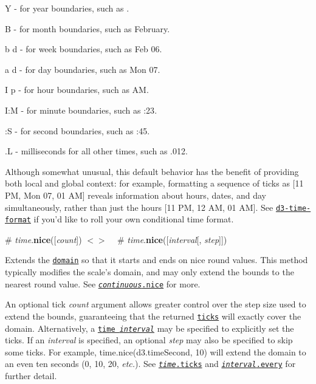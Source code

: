 \begin{DoxyItemize}
\item {\ttfamily Y} -\/ for year boundaries, such as {}.
\item {\ttfamily B} -\/ for month boundaries, such as {\ttfamily February}.
\item {\ttfamily b d} -\/ for week boundaries, such as {\ttfamily Feb 06}.
\item {\ttfamily a d} -\/ for day boundaries, such as {\ttfamily Mon 07}.
\item {\ttfamily I p} -\/ for hour boundaries, such as { AM}.
\item {\ttfamily I\+:M} -\/ for minute boundaries, such as {\+:23}.
\item {\ttfamily \+:S} -\/ for second boundaries, such as {\ttfamily \+:45}.
\item {\ttfamily .L} -\/ milliseconds for all other times, such as {\ttfamily .012}.
\end{DoxyItemize}

Although somewhat unusual, this default behavior has the benefit of providing both local and global context\+: for example, formatting a sequence of ticks as \mbox{[}11 PM, Mon 07, 01 AM\mbox{]} reveals information about hours, dates, and day simultaneously, rather than just the hours \mbox{[}11 PM, 12 AM, 01 AM\mbox{]}. See \href{https://github.com/d3/d3-time-format}{\tt d3-\/time-\/format} if you’d like to roll your own conditional time format.

\label{_time_nice}%
\# {\itshape time}.{\bfseries nice}(\mbox{[}{\itshape count}\mbox{]}) \href{https://github.com/d3/d3-scale/blob/master/src/time.js#L119}{\tt $<$$>$} ~\newline
\label{_time_nice}%
\# {\itshape time}.{\bfseries nice}(\mbox{[}{\itshape interval}\mbox{[}, {\itshape step}\mbox{]}\mbox{]})

Extends the \href{#time_domain}{\tt domain} so that it starts and ends on nice round values. This method typically modifies the scale’s domain, and may only extend the bounds to the nearest round value. See \href{#continuous_nice}{\tt {\itshape continuous}.nice} for more.

An optional tick {\itshape count} argument allows greater control over the step size used to extend the bounds, guaranteeing that the returned \href{#time_ticks}{\tt ticks} will exactly cover the domain. Alternatively, a \href{https://github.com/d3/d3-time#intervals}{\tt time {\itshape interval}} may be specified to explicitly set the ticks. If an {\itshape interval} is specified, an optional {\itshape step} may also be specified to skip some ticks. For example, {\ttfamily time.\+nice(d3.\+time\+Second, 10)} will extend the domain to an even ten seconds (0, 10, 20, {\itshape etc.}). See \href{#time_ticks}{\tt {\itshape time}.ticks} and \href{https://github.com/d3/d3-time#interval_every}{\tt {\itshape interval}.every} for further detail.

